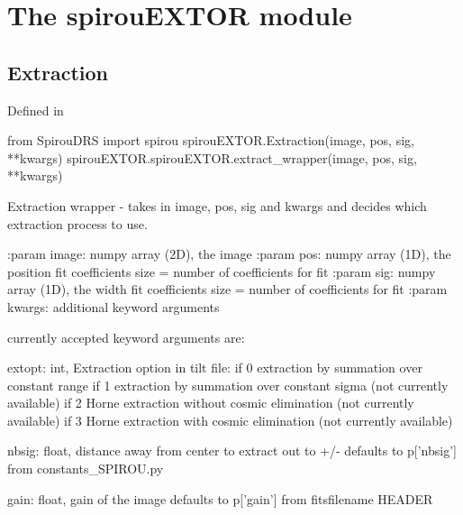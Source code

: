 
\clearpage
\newpage
\begin{minipage}{\textwidth}
\section{The spirouEXTOR module}
\label{ch:the_module:spirouEXTOR}

\subsection{Extraction}

Defined in \spirouEXTOR{}

\begin{pythonbox}
from SpirouDRS import spirou
spirouEXTOR.Extraction(image, pos, sig, **kwargs)
spirouEXTOR.spirouEXTOR.extract_wrapper(image, pos, sig, **kwargs)
\end{pythonbox}

\begin{pythondocstring}
Extraction wrapper - takes in image, pos, sig and kwargs and decides
which extraction process to use.

:param image: numpy array (2D), the image
:param pos: numpy array (1D), the position fit coefficients
            size = number of coefficients for fit
:param sig: numpy array (1D), the width fit coefficients
            size = number of coefficients for fit
:param kwargs: additional keyword arguments

currently accepted keyword arguments are:

    extopt:         int, Extraction option in tilt file:
                     if 0 extraction by summation over constant range
                     if 1 extraction by summation over constant sigma
                        (not currently available)
                     if 2 Horne extraction without cosmic elimination
                        (not currently available)
                     if 3 Horne extraction with cosmic elimination
                        (not currently available)

    nbsig:          float,  distance away from center to extract out to +/-
                    defaults to p['nbsig'] from constants_SPIROU.py

    gain:           float, gain of the image
                    defaults to p['gain'] from fitsfilename HEADER


\end{pythondocstring}
\end{minipage}
